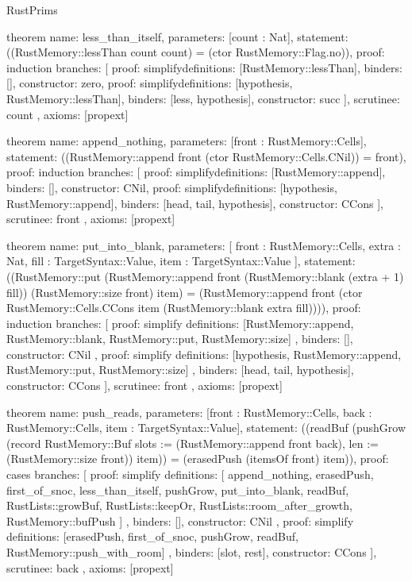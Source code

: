 \begin{lexlean}{RustPrims}
\begin{semanticmodule}
theorem{
  name: less_than_itself,
  parameters: [count : Nat],
  statement: ((RustMemory::lessThan count count) = (ctor RustMemory::Flag.no)),
  proof: induction{
    branches: [
      {proof: simplify{definitions: [RustMemory::lessThan]}, binders: [], constructor: zero},
      {
        proof: simplify{definitions: [hypothesis, RustMemory::lessThan]},
        binders: [less, hypothesis],
        constructor: succ
      }
    ],
    scrutinee: count
  },
  axioms: [propext]
}

theorem{
  name: append_nothing,
  parameters: [front : RustMemory::Cells],
  statement: ((RustMemory::append front (ctor RustMemory::Cells.CNil)) = front),
  proof: induction{
    branches: [
      {proof: simplify{definitions: [RustMemory::append]}, binders: [], constructor: CNil},
      {
        proof: simplify{definitions: [hypothesis, RustMemory::append]},
        binders: [head, tail, hypothesis],
        constructor: CCons
      }
    ],
    scrutinee: front
  },
  axioms: [propext]
}

theorem{
  name: put_into_blank,
  parameters: [
    front : RustMemory::Cells,
    extra : Nat,
    fill : TargetSyntax::Value,
    item : TargetSyntax::Value
  ],
  statement: ((RustMemory::put (RustMemory::append front (RustMemory::blank (extra + 1) fill)) (RustMemory::size front) item) = (RustMemory::append front (ctor RustMemory::Cells.CCons item (RustMemory::blank extra fill)))),
  proof: induction{
    branches: [
      {
        proof: simplify{
          definitions: [RustMemory::append, RustMemory::blank, RustMemory::put, RustMemory::size]
        },
        binders: [],
        constructor: CNil
      },
      {
        proof: simplify{
          definitions: [hypothesis, RustMemory::append, RustMemory::put, RustMemory::size]
        },
        binders: [head, tail, hypothesis],
        constructor: CCons
      }
    ],
    scrutinee: front
  },
  axioms: [propext]
}

theorem{
  name: push_reads,
  parameters: [front : RustMemory::Cells, back : RustMemory::Cells, item : TargetSyntax::Value],
  statement: ((readBuf (pushGrow (record RustMemory::Buf {slots := (RustMemory::append front back), len := (RustMemory::size front)}) item)) = (erasedPush (itemsOf front) item)),
  proof: cases{
    branches: [
      {
        proof: simplify{
          definitions: [
            append_nothing,
            erasedPush,
            first_of_snoc,
            less_than_itself,
            pushGrow,
            put_into_blank,
            readBuf,
            RustLists::growBuf,
            RustLists::keepOr,
            RustLists::room_after_growth,
            RustMemory::bufPush
          ]
        },
        binders: [],
        constructor: CNil
      },
      {
        proof: simplify{
          definitions: [erasedPush, first_of_snoc, pushGrow, readBuf, RustMemory::push_with_room]
        },
        binders: [slot, rest],
        constructor: CCons
      }
    ],
    scrutinee: back
  },
  axioms: [propext]
}


\end{semanticmodule}
\end{lexlean}
